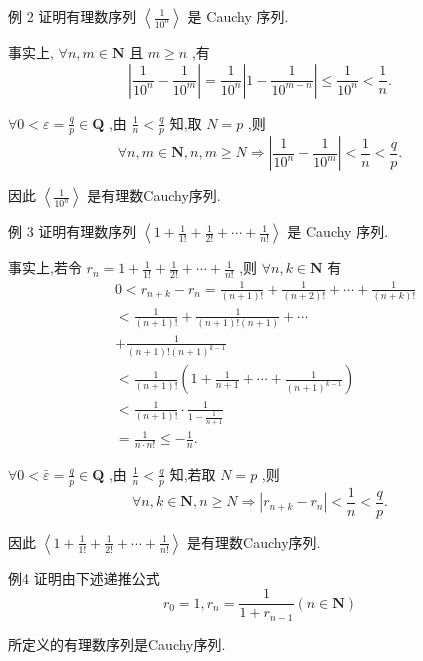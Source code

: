 例 2 证明有理数序列 $\left\langle  \frac{1}{{10}^{n}}\right\rangle$ 是 Cauchy 序列.

事实上, $\forall n,m \in  \mathbf{N}$ 且 $m \geq  n$ ,有
$$\left| {\frac{1}{{10}^{n}} - \frac{1}{{10}^{m}}}\right|  = \frac{1}{{10}^{n}}\left| {1 - \frac{1}{{10}^{m - n}}}\right|  \leq  \frac{1}{{10}^{n}} < \frac{1}{n}.$$

$\forall 0 < \varepsilon  = \frac{q}{p} \in  \mathbf{Q}$ ,由 $\frac{1}{n} < \frac{q}{p}$ 知,取 $N = p$ ,则
$$\forall n,m \in  \mathbf{N},n,m \geq  N \Rightarrow  \left| {\frac{1}{{10}^{n}} - \frac{1}{{10}^{m}}}\right|  < \frac{1}{n} < \frac{q}{p}.$$

因此 $\left\langle  \frac{1}{{10}^{n}}\right\rangle$ 是有理数Cauchy序列.

例 3 证明有理数序列 $\left\langle  {1 + \frac{1}{1!} + \frac{1}{2!} + \cdots  + \frac{1}{n!}}\right\rangle$ 是 Cauchy 序列.

事实上,若令 ${r}_{n} = 1 + \frac{1}{1!} + \frac{1}{2!} + \cdots  + \frac{1}{n!}$ ,则 $\forall n,k \in  \mathbf{N}$ 有
\begin{align*}
	&0 < {r}_{n + k} - {r}_{n} = \frac{1}{\left( {n + 1}\right) !} + \frac{1}{\left( {n + 2}\right) !} + \cdots  + \frac{1}{\left( {n + k}\right) !}\\
	&< \frac{1}{\left( {n + 1}\right) !} + \frac{1}{\left( {n + 1}\right) !\left( {n + 1}\right) } + \cdots\\
	&+ \frac{1}{\left( {n + 1}\right) !{\left( n + 1\right) }^{k - 1}}\\
	&< \frac{1}{\left( {n + 1}\right) !}\left( {1 + \frac{1}{n + 1} + \cdots  + \frac{1}{{\left( n + 1\right) }^{k - 1}}}\right)\\
	&< \frac{1}{\left( {n + 1}\right) !} \cdot  \frac{1}{1 - \frac{1}{n + 1}}\\
	&= \frac{1}{n \cdot  n!} \leq   - \frac{1}{n}.
\end{align*}

$\forall 0 < \bar{\varepsilon } = \frac{q}{p} \in  \mathbf{Q}$ ,由 $\frac{1}{n} < \frac{q}{p}$ 知,若取 $N = p$ ,则
$$\forall n,k \in  \mathbf{N},n \geq  N \Rightarrow  \left| {{r}_{n + k} - {r}_{n}}\right|  < \frac{1}{n} < \frac{q}{p}.$$

因此 $\left\langle  {1 + \frac{1}{1!} + \frac{1}{2!} + \cdots  + \frac{1}{n!}}\right\rangle$ 是有理数Cauchy序列.

例4 证明由下述递推公式
$${r}_{0} = 1,{r}_{n} = \frac{1}{1 + {r}_{n - 1}}\left( {n \in  \mathbf{N}}\right)$$

所定义的有理数序列是Cauchy序列.

